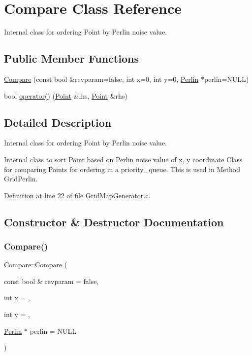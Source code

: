 \hypertarget{class_compare}{}\section{Compare Class Reference}
\label{class_compare}


Internal class for ordering Point by Perlin noise value.  


\subsection*{Public Member Functions}
\begin{DoxyCompactItemize}
\item 
\mbox{\hyperlink{class_compare_a94ef7da9625fc5eacb446dacbec8876d}{Compare}} (const bool \&revparam=false, int x=0, int y=0, \mbox{\hyperlink{class_world_architect_1_1_perlin}{Perlin}} $\ast$perlin=N\+U\+LL)
\item 
bool \mbox{\hyperlink{class_compare_ad6580c74acb6c4953248f062cffe4814}{operator()}} (\mbox{\hyperlink{vector_8h_ac82aba4f8f70541442a30f1598bd0649}{Point}} \&lhs, \mbox{\hyperlink{vector_8h_ac82aba4f8f70541442a30f1598bd0649}{Point}} \&rhs)
\end{DoxyCompactItemize}


\subsection{Detailed Description}
Internal class for ordering Point by Perlin noise value. 

Internal class to sort Point based on Perlin noise value of x, y coordinate Class for comparing Points for ordering in a priority\+\_\+queue. This is used in Method Grid\+Perlin. 

Definition at line 22 of file Grid\+Map\+Generator.\+c.



\subsection{Constructor \& Destructor Documentation}
\mbox{\label{class_compare_a94ef7da9625fc5eacb446dacbec8876d}} 
\subsubsection{\texorpdfstring{Compare()}{Compare()}}
{\footnotesize\ttfamily Compare\+::\+Compare (\begin{DoxyParamCaption}\item[{const bool \&}]{revparam = {\ttfamily false},  }\item[{int}]{x = {},  }\item[{int}]{y = {},  }\item[{\mbox{\hyperlink{class_world_architect_1_1_perlin}{Perlin}} $\ast$}]{perlin = {\ttfamily NULL} }\end{DoxyParamCaption})\hspace{0.3cm}{\ttfamily [inline]}}



